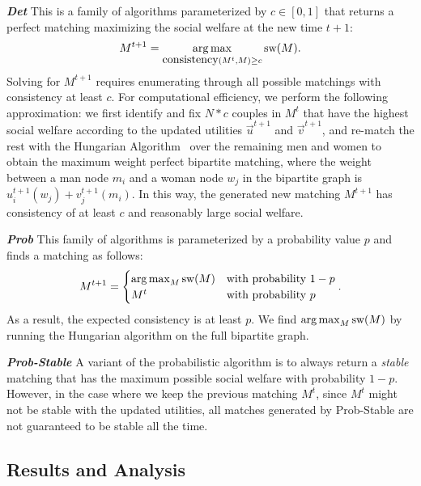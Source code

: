 \textit{\textbf{Det}} This is a family of algorithms parameterized by $c \in [0, 1]$ that returns a perfect matching maximizing the social welfare at the new time $t+1$: $$M^{t+1} = \operatorname*{arg\,max}_{\mbox{consistency}(M^t, M) \ge c}{\mbox{sw}(M)}.$$
Solving for $M^{t+1}$ requires enumerating through all possible matchings with consistency at least $c$. For computational efficiency, we perform the following approximation: we first identify and fix $N * c$ couples in $M^t$ that have the highest social welfare according to the updated utilities $\overrightarrow{u}^{t+1}$ and $\overrightarrow{v}^{t+1}$, and re-match the rest with the Hungarian Algorithm~\cite{Kuhn55thehungarian,Kuhn56thehungarian,Munkres1957Assignment} over the remaining men and women to obtain the maximum weight perfect bipartite matching, where the weight between a man node $m_i$ and a woman node $w_j$ in the bipartite graph is $u_i^{t+1}(w_j) + v_j^{t+1}(m_i)$. In this way, the generated new matching $M^{t+1}$ has consistency of at least $c$ and reasonably large social welfare.

\textit{\textbf{Prob}} This family of algorithms is parameterized by a probability value $p$ and finds a matching as follows:
$$M^{t+1} = \begin{cases} \operatorname*{arg\,max}_M{\mbox{sw}(M)} &\text{with probability $1-p$}\\ M^t &\text{with probability $p$}\end{cases}.$$
As a result, the expected consistency is at least $p$. We find $\operatorname*{arg\,max}_M{\mbox{sw}(M)}$ by running the Hungarian algorithm on the full bipartite graph.

\textit{\textbf{Prob-Stable}} A variant of the probabilistic algorithm is to always return a \textit{stable} matching that has the maximum possible social welfare with probability $1-p$. However, in the case where we keep the previous matching $M^t$, since $M^t$ might not be stable with the updated utilities, all matches generated by Prob-Stable are not guaranteed to be stable all the time. 



\subsection{Results and Analysis}

